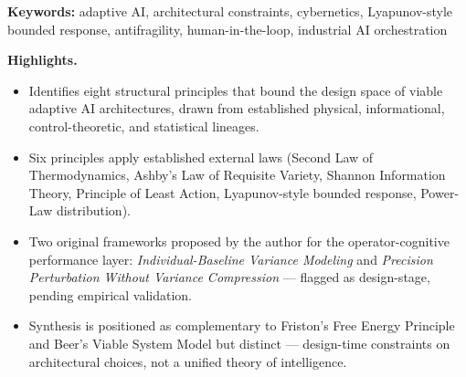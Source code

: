 \begin{abstract}
\noindent Adaptive artificial-intelligence systems are described in vague terms
--- \emph{self-improving}, \emph{resilient}, \emph{agentic} --- that
obscure the structural constraints under which such systems can actually
be viable. This paper identifies eight principles that bound the design
space of adaptive AI architectures. Six are established physical and
informational laws --- the Second Law of Thermodynamics, Ashby's Law of
Requisite Variety, Shannon's information theory, the Principle of Least
Action, Lyapunov stability, and the power-law distribution of system
events. Two are original frameworks proposed by the author for the
operator-cognitive performance layer of high-consequence systems:
\emph{Individual-Baseline Variance Modeling} and \emph{Precision
Perturbation Without Variance Compression}. The eight principles operate
as architectural design constraints, not as a theory of intelligence.
The first six are illustrated with their operational form inside MILO, a
patent-pending adaptive AI orchestrator developed by the author and
submitted to the U.S. Department of Energy under the Genesis Mission;
the seventh and eighth are v.5 design-stage frameworks, not shipped
operator-monitoring features. The synthesis is consistent with, and
complementary to, Friston's Free Energy Principle, Beer's Viable System
Model, and recent thermodynamics-adjacent AI work; it differs in that
the eight principles are used as design-time constraints on
architectural choices, not as a unified explanation of intelligence.
\end{abstract}

\noindent\textbf{Keywords:} adaptive AI, architectural constraints, cybernetics,
Lyapunov-style bounded response, antifragility, human-in-the-loop,
industrial AI orchestration\par

\textbf{Highlights.}

\begin{itemize}
\tightlist
\item
  Identifies eight structural principles that bound the design space of
  viable adaptive AI architectures, drawn from established physical,
  informational, control-theoretic, and statistical lineages.
\item
  Six principles apply established external laws (Second Law of
  Thermodynamics, Ashby's Law of Requisite Variety, Shannon Information
  Theory, Principle of Least Action, Lyapunov-style bounded response,
  Power-Law distribution).
\item
  Two original frameworks proposed by the author for the
  operator-cognitive performance layer: \emph{Individual-Baseline
  Variance Modeling} and \emph{Precision Perturbation Without Variance
  Compression} --- flagged as design-stage, pending empirical
  validation.
\item
  Synthesis is positioned as complementary to Friston's Free Energy
  Principle and Beer's Viable System Model but distinct --- design-time
  constraints on architectural choices, not a unified theory of
  intelligence.
\end{itemize}

